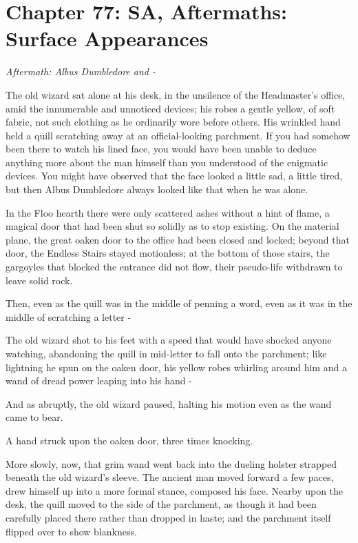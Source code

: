 \chapter{Chapter 77: SA, Aftermaths: Surface Appearances}
\emph{Aftermath: Albus Dumbledore and -}

The old wizard sat alone at his desk, in the unsilence of the
Headmaster's office, amid the innumerable and unnoticed devices; his
robes a gentle yellow, of soft fabric, not such clothing as he
ordinarily wore before others. His wrinkled hand held a quill scratching
away at an official-looking parchment. If you had somehow been there to
watch his lined face, you would have been unable to deduce anything more
about the man himself than you understood of the enigmatic devices. You
might have observed that the face looked a little sad, a little tired,
but then Albus Dumbledore always looked like that when he was alone.

In the Floo hearth there were only scattered ashes without a hint of
flame, a magical door that had been shut so solidly as to stop existing.
On the material plane, the great oaken door to the office had been
closed and locked; beyond that door, the Endless Stairs stayed
motionless; at the bottom of those stairs, the gargoyles that blocked
the entrance did not flow, their pseudo-life withdrawn to leave solid
rock.

Then, even as the quill was in the middle of penning a word, even as it
was in the middle of scratching a letter -

The old wizard shot to his feet with a speed that would have shocked
anyone watching, abandoning the quill in mid-letter to fall onto the
parchment; like lightning he spun on the oaken door, his yellow robes
whirling around him and a wand of dread power leaping into his hand -

And as abruptly, the old wizard paused, halting his motion even as the
wand came to bear.

A hand struck upon the oaken door, three times knocking.

More slowly, now, that grim wand went back into the dueling holster
strapped beneath the old wizard's sleeve. The ancient man moved forward
a few paces, drew himself up into a more formal stance, composed his
face. Nearby upon the desk, the quill moved to the side of the
parchment, as though it had been carefully placed there rather than
dropped in haste; and the parchment itself flipped over to show
blankness.

